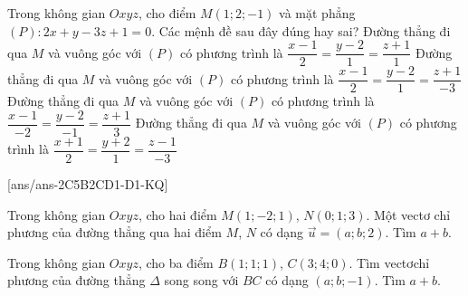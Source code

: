 \begin{ex}%
	Trong không gian $Oxyz$, cho điểm $M(1;2;-1)$ và mặt phẳng $(P)\colon 2x+y-3z+1=0$. Các mệnh đề sau đây đúng hay sai?
	\choiceTF
	{ Đường thẳng đi qua $M$ và vuông góc với $(P)$ có phương trình là $\dfrac{x-1}{2}=\dfrac{y-2}{1}=\dfrac{z+1}{1}$}
	{\True  Đường thẳng đi qua $M$ và vuông góc với $(P)$ có phương trình là $\dfrac{x-1}{2}=\dfrac{y-2}{1}=\dfrac{z+1}{-3}$}
	{\True  Đường thẳng đi qua $M$ và vuông góc với ${(P)}$ có phương trình là $\dfrac{x-1}{-2}=\dfrac{y-2}{-1}=\dfrac{z+1}{3}$}
	{Đường thẳng đi qua $M$ và vuông góc với $(P)$ có phương trình là $\dfrac{x+1}{2}=\dfrac{y+2}{1}=\dfrac{z-1}{-3}$}
\end{ex}


[ans/ans-2C5B2CD1-D1-KQ]
\TNSA
\begin{ex}%
	Trong không gian $Oxyz$, cho hai điểm $M\left( 1;-2;1 \right)$, $N\left( 0;1;3 \right)$. Một vectơ chỉ phương của đường thẳng qua hai điểm $M$, $N$ có dạng $\overrightarrow{u}=(a;b;2)$. Tìm $a+b.$
\end{ex}
\begin{ex}%
	Trong không gian $Oxyz$, cho ba điểm $B\left( 1;1;1 \right)$, $C\left( 3;4;0 \right)$. Tìm vectơchỉ phương của đường thẳng $\Delta $ song song với $BC$ có dạng $(a;b;-1)$. Tìm $a+b$.
\end{ex}

